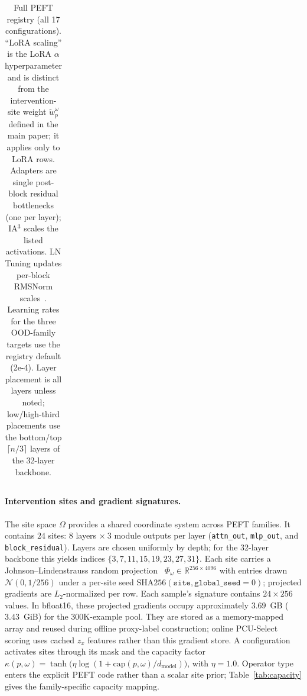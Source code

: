 \begin{table}[t]
\begin{tabular}{@{}llllccl@{}}
\bottomrule
\end{tabular}
\caption{Full PEFT registry (all 17 configurations). ``LoRA scaling'' is the
LoRA $\alpha$ hyperparameter and is distinct from the intervention-site weight
$\tilde{w}_p^\omega$ defined in the main paper; it applies only to LoRA rows.
Adapters are single post-block residual bottlenecks (one per layer); IA$^3$
scales the listed activations. LN Tuning updates per-block RMSNorm scales~\cite{wang2022lntuning,touvron2023llama2}.
Learning rates for the three OOD-family targets
use the registry default (2e-4). Layer placement is all layers unless noted;
low/high-third placements use the bottom/top $\lceil n/3 \rceil$ layers of the
32-layer backbone.}
\label{tab:appendix-peft-registry}
\end{table}

\paragraph{Intervention sites and gradient signatures.}
The site space $\Omega$ provides a shared coordinate system across PEFT families.
It contains $24$ sites: $8$ layers $\times\ 3$ module outputs per layer
(\texttt{attn\_out}, \texttt{mlp\_out}, and \texttt{block\_residual}). Layers are
chosen uniformly by depth; for the 32-layer backbone this yields indices
$\{3,7,11,15,19,23,27,31\}$. Each site carries a Johnson--Lindenstrauss random
projection~\cite{johnson1984jl} $\Phi_\omega \in \mathbb{R}^{256 \times 4096}$ with entries drawn
$\mathcal{N}(0, 1/256)$ under a per-site seed
$\mathrm{SHA256}(\texttt{site}, \texttt{global\_seed}{=}0)$; projected gradients
are $L_2$-normalized per row. Each sample's signature contains $24\times256$
values. In bfloat16, these projected gradients occupy approximately $3.69$~GB
($3.43$~GiB) for the 300K-example pool. They are stored as a memory-mapped array
and reused during offline proxy-label construction; online PCU-Select scoring
uses cached $z_x$ features rather than this gradient store. A configuration
activates sites through its mask and the capacity factor
$\kappa(p,\omega)=\tanh\!\big(\eta\log(1+\mathrm{cap}(p,\omega)/d_{\mathrm{model}})\big)$,
with $\eta{=}1.0$. Operator type enters the explicit PEFT code rather than a
scalar site prior; Table~\ref{tab:capacity} gives the family-specific capacity
mapping.

